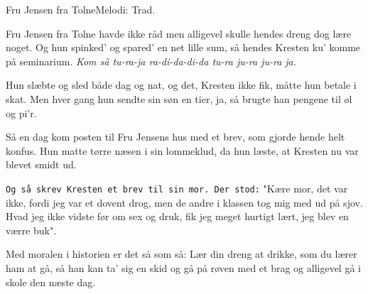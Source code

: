\begin{sang}{Fru Jensen fra Tolne}{Melodi: Trad.}
\begin{vers}
Fru Jensen fra Tolne havde ikke råd
men alligevel skulle hendes dreng dog lære noget.
Og hun spinked' og spared' en net lille sum,
så hendes Kresten ku' komme på seminarium.
{\em Kom så tu-ra-ja
ra-di-da-di-da
tu-ra ju-ra ju-ra ja.}
\end{vers}
\begin{vers}
Hun slæbte og sled både dag og nat,
og det, Kresten ikke fik, måtte hun betale i skat.
Men hver gang hun sendte sin søn en tier,
ja, så brugte han pengene til øl og pi'r.
\end{vers}
\begin{vers}
Så en dag kom posten til Fru Jensens hus
med et brev, som gjorde hende helt konfus.
Hun matte tørre næsen i sin lommeklud,
da hun læste, at Kresten nu var blevet smidt ud.
\end{vers}
\begin{vers}
{\tt Og så skrev Kresten et brev til sin mor.
Der stod:}
"Kære mor, det var ikke, fordi jeg var et dovent drog,
men de andre i klassen tog mig med ud på  sjov.
Hvad jeg ikke vidste før om sex og druk,
fik jeg meget hurtigt lært, jeg blev en værre buk".
\end{vers}
\begin{vers}
Med moralen i historien er det så som så:
Lær din dreng at drikke, som du lærer ham at gå,
så han kan ta' sig en skid og gå på røven med et brag
og alligevel gå i skole den næste dag.
\end{vers}
\laps
\end{sang}